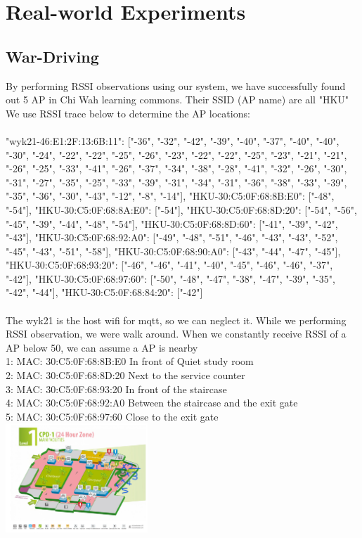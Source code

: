 \section{Real-world Experiments}

\subsection{War-Driving}
By performing RSSI observations using our system, we have successfully found out 5 AP in Chi Wah learning commons. Their SSID (AP name) are all "HKU"\\
We use  RSSI trace below to determine the AP locations:\\
\\
{"wyk21-46:E1:2F:13:6B:11": ["-36", "-32", "-42", "-39", "-40", "-37", "-40", "-40", "-30", "-24", "-22", "-22", "-25", "-26", "-23", "-22", "-22", "-25", "-23", "-21", "-21", "-26", "-25", "-33", "-41", "-26", "-37", "-34", "-38", "-28", "-41", "-32", "-26", "-30", "-31", "-27", "-35", "-25", "-33", "-39", "-31", "-34", "-31", "-36", "-38", "-33", "-39", "-35", "-36", "-30", "-43", "-12", "-8", "-14"], "HKU-30:C5:0F:68:8B:E0": ["-48", "-54"], "HKU-30:C5:0F:68:8A:E0": ["-54"], "HKU-30:C5:0F:68:8D:20": ["-54", "-56", "-45", "-39", "-44", "-48", "-54"], "HKU-30:C5:0F:68:8D:60": ["-41", "-39", "-42", "-43"], "HKU-30:C5:0F:68:92:A0": ["-49", "-48", "-51", "-46", "-43", "-43", "-52", "-45", "-43", "-51", "-58"], "HKU-30:C5:0F:68:90:A0": ["-43", "-44", "-47", "-45"], "HKU-30:C5:0F:68:93:20": ["-46", "-46", "-41", "-40", "-45", "-46", "-46", "-37", "-42"], "HKU-30:C5:0F:68:97:60": ["-50", "-48", "-47", "-38", "-47", "-39", "-35", "-42", "-44"], "HKU-30:C5:0F:68:84:20": ["-42"]}\\
\\
The wyk21 is the host wifi for mqtt, so we can neglect it. While we performing RSSI observation, we were walk around. When we constantly receive RSSI of a AP below 50, we can assume a AP is nearby\\


1: MAC: 30:C5:0F:68:8B:E0 In front of Quiet study room\\
2: MAC: 30:C5:0F:68:8D:20 Next to the service counter\\
3: MAC: 30:C5:0F:68:93:20 In front of the staircase\\
4: MAC: 30:C5:0F:68:92:A0 Between the staircase and the exit gate\\
5: MAC: 30:C5:0F:68:97:60 Close to the exit gate\\
\includegraphics[width=0.4\textwidth]{Markedfloorplan.png}\\

